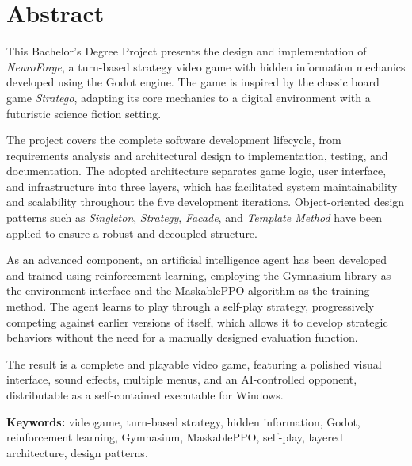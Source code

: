 \chapter*{Abstract}

This Bachelor's Degree Project presents the design and implementation of \textit{NeuroForge}, a turn-based strategy video game with hidden information mechanics developed using the Godot engine. The game is inspired by the classic board game \textit{Stratego}, adapting its core mechanics to a digital environment with a futuristic science fiction setting.

The project covers the complete software development lifecycle, from requirements analysis and architectural design to implementation, testing, and documentation. The adopted architecture separates game logic, user interface, and infrastructure into three layers, which has facilitated system maintainability and scalability throughout the five development 
iterations. Object-oriented design patterns such as \textit{Singleton}, \textit{Strategy}, \textit{Facade}, and \textit{Template Method} have been applied to ensure a robust and decoupled structure.

As an advanced component, an artificial intelligence agent has been developed and trained using reinforcement learning, employing the Gymnasium library as the environment interface and the MaskablePPO algorithm as the training method. The agent learns to play through a self-play strategy, progressively competing against earlier versions of itself, which allows 
it to develop strategic behaviors without the need for a manually designed evaluation function.

The result is a complete and playable video game, featuring a polished visual interface, sound effects, multiple menus, and an AI-controlled opponent, distributable as a self-contained executable for Windows.

\vspace{0.5cm}
\noindent \textbf{Keywords:} videogame, turn-based strategy, hidden information, Godot, reinforcement learning, Gymnasium, MaskablePPO, self-play, layered architecture, design patterns.